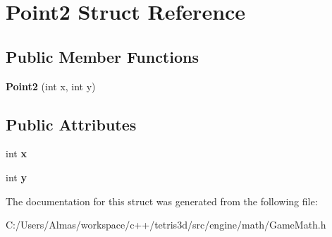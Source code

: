 \hypertarget{struct_point2}{\section{Point2 Struct Reference}
\label{struct_point2}
}
\subsection*{Public Member Functions}
\begin{DoxyCompactItemize}
\item 
\hypertarget{struct_point2_a093f9d148c0ac81bd0c9322033572e6a}{{\bfseries Point2} (int x, int y)}\label{struct_point2_a093f9d148c0ac81bd0c9322033572e6a}

\end{DoxyCompactItemize}
\subsection*{Public Attributes}
\begin{DoxyCompactItemize}
\item 
\hypertarget{struct_point2_ab40b3a56d6bcfa29be01dbbd2b66403e}{int {\bfseries x}}\label{struct_point2_ab40b3a56d6bcfa29be01dbbd2b66403e}

\item 
\hypertarget{struct_point2_adecb218afe5a59fc0b13e80f3c8f5b4c}{int {\bfseries y}}\label{struct_point2_adecb218afe5a59fc0b13e80f3c8f5b4c}

\end{DoxyCompactItemize}


The documentation for this struct was generated from the following file\-:\begin{DoxyCompactItemize}
\item 
C\-:/\-Users/\-Almas/workspace/c++/tetris3d/src/engine/math/Game\-Math.\-h\end{DoxyCompactItemize}
